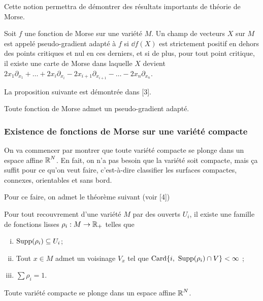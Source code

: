 Cette notion permettra de démontrer des résultats importants de théorie de Morse.
\begin{defi}
    Soit $f$ une fonction de Morse sur une variété $M$. 
    Un champ de vecteurs $X$ sur $M$ est appelé pseudo-gradient adapté à $f$ si 
    $\dd f(X)$ est strictement positif en dehors des points critiques et nul en 
    ces derniers, et si de plus, pour tout point critique, il existe une carte 
    de Morse dans laquelle $X$ devient 
    $2x_1\partial_{x_1}+\dots+2x_i\partial_{x_i}-2x_{i+1}\partial_{x_{i+1}}-\dots-2x_n\partial_{x_n}$.
\end{defi}

La proposition suivante est démontrée dans [3].
\begin{prop}
    Toute fonction de Morse admet un pseudo-gradient adapté.
\end{prop}

\subsubsection{Existence de fonctions de Morse sur une variété compacte}
On va commencer par montrer que toute variété compacte se plonge dans un espace affine $\operatorname{\mathbb R}^N$. 
En fait, on n'a pas besoin que la variété soit compacte, mais ça suffit pour ce qu'on veut faire, 
c'est-à-dire classifier les surfaces compactes, connexes, orientables et sans bord.

Pour ce faire, on admet le théorème suivant (voir [4])
\begin{thm}
    Pour tout recouvrement d'une variété $M$ par des ouverts $U_i$, il existe une famille 
    de fonctions lisses $\rho_i:M\to \operatorname{\mathbb R}_+$ telles que 
    \begin{enumerate}[(i)]
        \item $\operatorname{Supp}(\rho_i)\subseteq U_i$;
        \item Tout $x\in M$ admet un voisinage $V_x$ tel que 
        $\operatorname{Card}\lbrace i,\ \operatorname{Supp}(\rho_i)\cap V\rbrace<\infty$ ;
        \item $\sum\rho_i=1$.
    \end{enumerate}
\end{thm}

\begin{thm}
    Toute variété compacte se plonge dans un espace affine $\operatorname{\mathbb R}^N$.
\end{thm}

